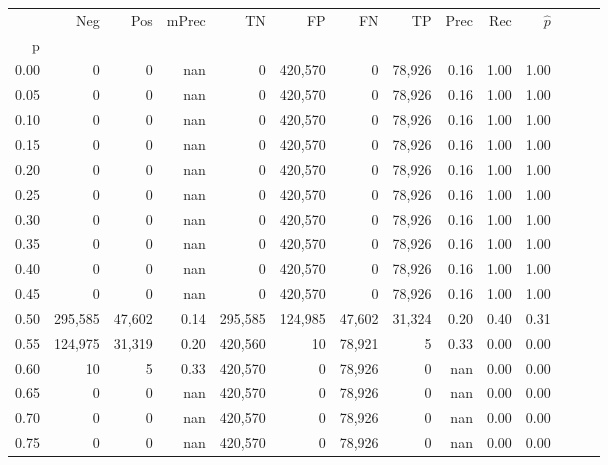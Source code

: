 \begin{tabular}{rrrrrrrrrrrrrr}
\toprule
{} &      Neg &     Pos & mPrec &       TN &       FP &      FN &      TP &  Prec &   Rec & $\hat{p}$ \\
p    &          &         &       &          &          &         &         &       &       &           \\
\midrule
0.00 &        0 &       0 &   nan &        0 &  420,570 &       0 &  78,926 &  0.16 &  1.00 &      1.00 \\
0.05 &        0 &       0 &   nan &        0 &  420,570 &       0 &  78,926 &  0.16 &  1.00 &      1.00 \\
0.10 &        0 &       0 &   nan &        0 &  420,570 &       0 &  78,926 &  0.16 &  1.00 &      1.00 \\
0.15 &        0 &       0 &   nan &        0 &  420,570 &       0 &  78,926 &  0.16 &  1.00 &      1.00 \\
0.20 &        0 &       0 &   nan &        0 &  420,570 &       0 &  78,926 &  0.16 &  1.00 &      1.00 \\
0.25 &        0 &       0 &   nan &        0 &  420,570 &       0 &  78,926 &  0.16 &  1.00 &      1.00 \\
0.30 &        0 &       0 &   nan &        0 &  420,570 &       0 &  78,926 &  0.16 &  1.00 &      1.00 \\
0.35 &        0 &       0 &   nan &        0 &  420,570 &       0 &  78,926 &  0.16 &  1.00 &      1.00 \\
0.40 &        0 &       0 &   nan &        0 &  420,570 &       0 &  78,926 &  0.16 &  1.00 &      1.00 \\
0.45 &        0 &       0 &   nan &        0 &  420,570 &       0 &  78,926 &  0.16 &  1.00 &      1.00 \\
0.50 &  295,585 &  47,602 &  0.14 &  295,585 &  124,985 &  47,602 &  31,324 &  0.20 &  0.40 &      0.31 \\
0.55 &  124,975 &  31,319 &  0.20 &  420,560 &       10 &  78,921 &       5 &  0.33 &  0.00 &      0.00 \\
0.60 &       10 &       5 &  0.33 &  420,570 &        0 &  78,926 &       0 &   nan &  0.00 &      0.00 \\
0.65 &        0 &       0 &   nan &  420,570 &        0 &  78,926 &       0 &   nan &  0.00 &      0.00 \\
0.70 &        0 &       0 &   nan &  420,570 &        0 &  78,926 &       0 &   nan &  0.00 &      0.00 \\
0.75 &        0 &       0 &   nan &  420,570 &        0 &  78,926 &       0 &   nan &  0.00 &      0.00 \\

\end{tabular}
